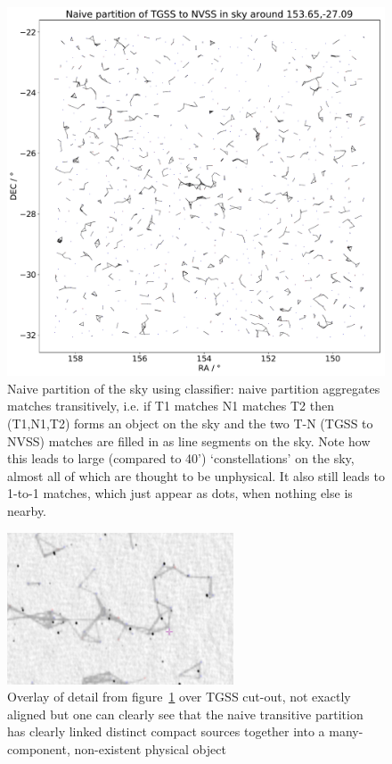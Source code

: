 \documentclass[12pt,a4paper]{article}
\begin{document}
\begin{figure}[H]
    \centering
    \includegraphics[width=\textwidth]{pics/torch_lr_partition.pdf}
    \caption{Naive partition of the sky using classifier: naive partition aggregates matches transitively, i.e. if T1 matches N1 matches T2 then (T1,N1,T2) forms an object on the sky and the two T-N (TGSS to NVSS) matches are filled in as line segments on the sky. Note how this leads to large (compared to 40') `constellations' on the sky, almost all of which are thought to be unphysical. It also still leads to 1-to-1 matches, which just appear as dots, when nothing else is nearby.}
    \label{fig:torch_lr_partition}%
\end{figure}

\begin{figure}[ht]
    \centering
    \includegraphics[width=0.6\textwidth]{pics/overlayoverlay.png}
    \caption{Overlay of detail from figure~\ref{fig:torch_lr_partition} over TGSS cut-out, not exactly aligned but one can clearly see that the naive transitive partition has clearly linked distinct compact sources together into a many-component, non-existent physical object}
    \label{fig:overlay}
\end{figure}
\end{document}

